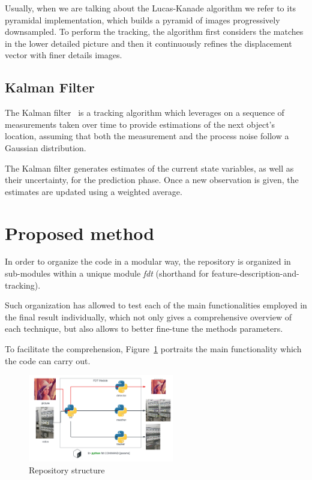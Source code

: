 \documentclass[journal]{IEEEtran}
\begin{document}
Usually, when we are talking about the Lucas-Kanade algorithm we refer to its pyramidal implementation, which builds a pyramid of images progressively downsampled. To perform the tracking, the algorithm first considers the matches in the lower detailed picture and then it continuously refines the displacement vector with finer details images.

\subsection{Kalman Filter}
The Kalman filter~\cite{kalman1960new} is a tracking algorithm which leverages on a sequence of measurements taken over time to provide estimations of the next object's location, assuming that both the measurement and the process noise follow a Gaussian distribution.

The Kalman filter generates estimates of the current state variables, as well as their uncertainty, for the prediction phase. Once a new observation is given, the estimates are updated using a weighted average.

\section{Proposed method}
\label{sec:projectstructure}
In order to organize the code in a modular way, the repository is organized in sub-modules within a unique module \emph{fdt} (shorthand for feature-description-and-tracking). 

Such organization has allowed to test each of the main functionalities employed in the final result individually, which not only gives a comprehensive overview of each technique, but also allows to better fine-tune the methods parameters.

To facilitate the comprehension, Figure~\ref{fig:repository} portraits the main functionality which the code can carry out. 

\begin{figure}
    \centering
    \includegraphics[angle=270,origin=c,width=2.5in]{images/structure.png}
    \caption{Repository structure}
    \label{fig:repository}
\end{figure}
\end{document}
